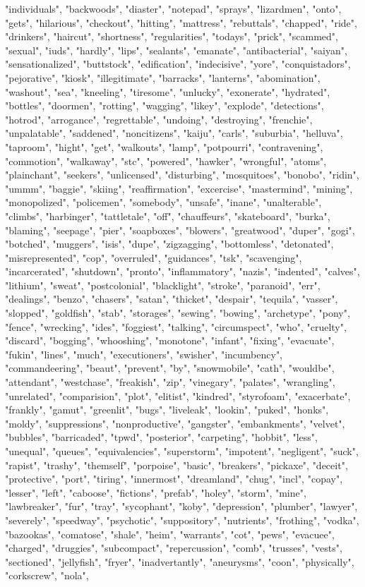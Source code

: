 "individuals", "backwoods", "diaster", "notepad", "sprays", "lizardmen", "onto", "gets", "hilarious", "checkout", "hitting", "mattress", "rebuttals", "chapped", "ride", "drinkers", "haircut", "shortness", "regularities", "todays", "prick", "scammed", "sexual", "iuds", "hardly", "lips", "sealants", "emanate", "antibacterial", "saiyan", "sensationalized", "buttstock", "edification", "indecisive", "yore", "conquistadors", "pejorative", "kiosk", "illegitimate", "barracks", "lanterns", "abomination", "washout", "sea", "kneeling", "tiresome", "unlucky", "exonerate", "hydrated", "bottles", "doormen", "rotting", "wagging", "likey", "explode", "detections", "hotrod", "arrogance", "regrettable", "undoing", "destroying", "frenchie", "unpalatable", "saddened", "noncitizens", "kaiju", "carls", "suburbia", "helluva", "taproom", "hight", "get", "walkouts", "lamp", "potpourri", "contravening", "commotion", "walkaway", "stc", "powered", "hawker", "wrongful", "atoms", "plainchant", "seekers", "unlicensed", "disturbing", "mosquitoes", "bonobo", "ridin", "ummm", "baggie", "skiing", "reaffirmation", "excercise", "mastermind", "mining", "monopolized", "policemen", "somebody", "unsafe", "inane", "unalterable", "climbs", "harbinger", "tattletale", "off", "chauffeurs", "skateboard", "burka", "blaming", "seepage", "pier", "soapboxes", "blowers", "greatwood", "duper", "gogi", "botched", "muggers", "isis", "dupe", "zigzagging", "bottomless", "detonated", "misrepresented", "cop", "overruled", "guidances", "tsk", "scavenging", "incarcerated", "shutdown", "pronto", "inflammatory", "nazis", "indented", "calves", "lithium", "sweat", "postcolonial", "blacklight", "stroke", "paranoid", "err", "dealings", "benzo", "chasers", "satan", "thicket", "despair", "tequila", "vasser", "slopped", "goldfish", "stab", "storages", "sewing", "bowing", "archetype", "pony", "fence", "wrecking", "ides", "foggiest", "talking", "circumspect", "who", "cruelty", "discard", "bogging", "whooshing", "monotone", "infant", "fixing", "evacuate", "fukin", "lines", "much", "executioners", "swisher", "incumbency", "commandeering", "beaut", "prevent", "by", "snowmobile", "cath", "wouldbe", "attendant", "westchase", "freakish", "zip", "vinegary", "palates", "wrangling", "unrelated", "comparision", "plot", "elitist", "kindred", "styrofoam", "exacerbate", "frankly", "gamut", "greenlit", "bugs", "liveleak", "lookin", "puked", "honks", "moldy", "suppressions", "nonproductive", "gangster", "embankments", "velvet", "bubbles", "barricaded", "tpwd", "posterior", "carpeting", "hobbit", "less", "unequal", "queues", "equivalencies", "superstorm", "impotent", "negligent", "suck", "rapist", "trashy", "themself", "porpoise", "basic", "breakers", "pickaxe", "deceit", "protective", "port", "tiring", "innermost", "dreamland", "chug", "incl", "copay", "lesser", "left", "caboose", "fictions", "prefab", "holey", "storm", "mine", "lawbreaker", "fur", "tray", "sycophant", "koby", "depression", "plumber", "lawyer", "severely", "speedway", "psychotic", "suppository", "nutrients", "frothing", "vodka", "bazookas", "comatose", "shale", "heim", "warrants", "cot", "pews", "evacuee", "charged", "druggies", "subcompact", "repercussion", "comb", "trusses", "vests", "sectioned", "jellyfish", "fryer", "inadvertantly", "aneurysms", "coon", "physically", "corkscrew", "nola", 
